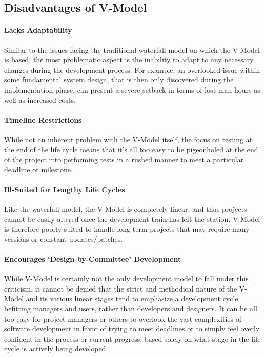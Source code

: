 \documentclass[main.tex]{subfiles}
\begin{document}
\subsection{Disadvantages of V-Model}

\paragraph{Lacks Adaptability}
Similar to the issues facing the traditional waterfall model on which the V-Model is based, the most problematic aspect is the inability to adapt to any necessary changes during the development process.
For example, an overlooked issue within some fundamental system design, that is then only discovered during the implementation phase, can present a severe setback in terms of lost man-hours as well as increased costs.

\paragraph{Timeline Restrictions}
While not an inherent problem with the V-Model itself, the focus on testing at the end of the life cycle means that it’s all too easy to be pigeonholed at the end of the project into performing tests in a rushed manner to meet a particular deadline or milestone.

\paragraph{Ill-Suited for Lengthy Life Cycles}
Like the waterfall model, the V-Model is completely linear, and thus projects cannot be easily altered once the development train has left the station.
V-Model is therefore poorly suited to handle long-term projects that may require many versions or constant updates/patches.

\paragraph{Encourages ‘Design-by-Committee’ Development}
While V-Model is certainly not the only development model to fall under this criticism, it cannot be denied that the strict and methodical nature of the V-Model and its various linear stages tend to emphasize a development cycle befitting managers and users, rather than developers and designers.
It can be all too easy for project managers or others to overlook the vast complexities of software development in favor of trying to meet deadlines or to simply feel overly confident in the process or current progress, based solely on what stage in the life cycle is actively being developed.

\nocite{*}
\end{document}
